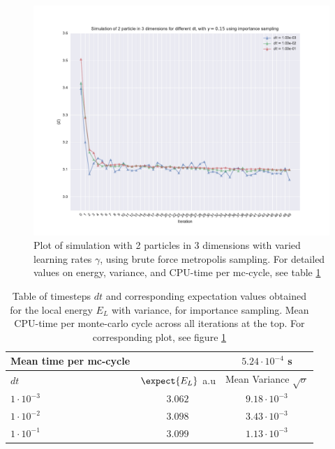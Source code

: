 \begin{figure}[h]
\hspace{-2.8cm}
\includegraphics[width = \paperwidth]{figures/importance_2p_3d_dt.pdf}
\caption{Plot of simulation with 2 particles in 3 dimensions with varied learning rates $\gamma$, using brute force metropolis sampling.
			For detailed values on energy, variance, and CPU-time per mc-cycle, see table \ref{tab:importance-nin-dt}}
\label{fig:importance-nin-dt}
\end{figure}

\begin{table}[h]
\begin{tabular}{l c c}
	Mean time per mc-cycle & & $5.24\cdot10^{-4}$ s \\
	\hline
	$dt$ & $\expect{E_L}$ a.u & Mean Variance $\sqrt{\sigma}$\\
	\hline
	$1\cdot10^{-3}$ & $3.062$ & $9.18\cdot10^{-3}$ \\
	$1\cdot10^{-2}$ & $3.098$ & $3.43\cdot10^{-3}$ \\
	$1\cdot10^{-1}$ & $3.099$ & $1.13\cdot10^{-3}$ \\
\end{tabular}
\label{tab:importance-nin-dt}
\caption{Table of timesteps $dt$ and corresponding expectation values obtained for the local energy $E_L$ with variance, for importance sampling.
		Mean CPU-time per monte-carlo cycle across all iterations at the top.
	For corresponding plot, see figure \ref{fig:importance-nin-dt}}
\end{table}

